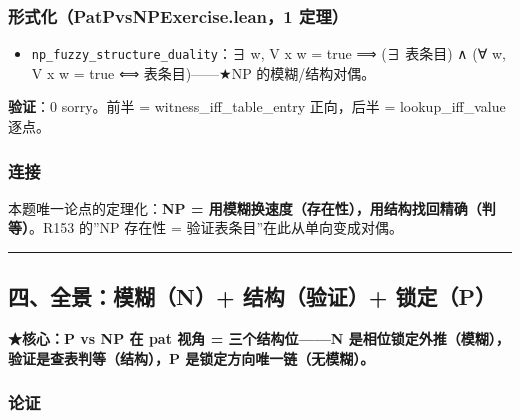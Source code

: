 \documentclass[
]{article}
\providecommand{\tightlist}{%
 \setlength{\itemsep}{0pt}\setlength{\parskip}{0pt}}
\begin{document}
\subsubsection{形式化（PatPvsNPExercise.lean，1
定理）}\label{ux5f62ux5f0fux5316patpvsnpexercise.lean1-ux5b9aux7406-2}

\begin{itemize}
\tightlist
\item
 \texttt{np\_fuzzy\_structure\_duality}：∃ w, V x w = true ⟹ (∃ 表条目)
 ∧ (∀ w, V x w = true ⟺ 表条目)------★NP 的模糊/结构对偶。
\end{itemize}

\textbf{验证}：0 sorry。前半 = witness\_iff\_table\_entry 正向，后半 =
lookup\_iff\_value 逐点。

\subsubsection{连接}\label{ux8fdeux63a5-2}

本题唯一论点的定理化：\textbf{NP =
用模糊换速度（存在性），用结构找回精确（判等）}。R153 的''NP 存在性 =
验证表条目''在此从单向变成对偶。

\begin{center}\rule{0.5\linewidth}{0.5pt}\end{center}

\subsection{四、全景：模糊（N）+ 结构（验证）+
锁定（P）}\label{ux56dbux5168ux666fux6a21ux7ccan-ux7ed3ux6784ux9a8cux8bc1-ux9501ux5b9ap}

\textbf{★核心：P vs NP 在 pat 视角 = 三个结构位------N
是相位锁定外推（模糊），验证是查表判等（结构），P
是锁定方向唯一链（无模糊）。}

\subsubsection{论证}\label{ux8bbaux8bc1-3}
\end{document}
